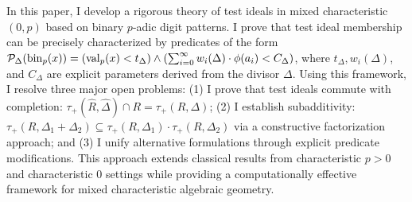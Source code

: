 In this paper, I develop a rigorous theory of test ideals in mixed characteristic $(0,p)$ based on binary $p$-adic digit patterns. I prove that test ideal membership can be precisely characterized by predicates of the form $\mathcal{P}_\Delta(\operatorname{bin}_p(x)) = (\operatorname{val}_p(x) < t_\Delta) \wedge (\sum_{i=0}^{\infty} w_i(\Delta) \cdot \phi(a_i) < C_\Delta)$, where $t_\Delta, w_i(\Delta)$, and $C_\Delta$ are explicit parameters derived from the divisor $\Delta$. Using this framework, I resolve three major open problems: (1) I prove that test ideals commute with completion: $\tau_+(\hat{R},\hat{\Delta}) \cap R = \tau_+(R,\Delta)$; (2) I establish subadditivity: $\tau_+(R,\Delta_1+\Delta_2) \subseteq \tau_+(R,\Delta_1) \cdot \tau_+(R,\Delta_2)$ via a constructive factorization approach; and (3) I unify alternative formulations through explicit predicate modifications. This approach extends classical results from characteristic $p > 0$ and characteristic $0$ settings while providing a computationally effective framework for mixed characteristic algebraic geometry. 
